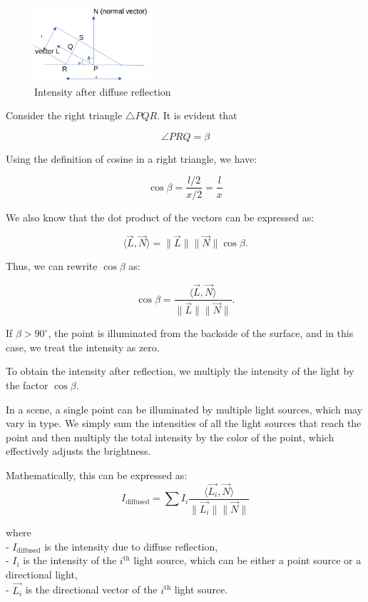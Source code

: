 \documentclass[conference]{IEEEtran}
\begin{document}
\begin{figure}[htbp]
    \centerline{\includegraphics[width=0.38\textwidth]{./figs/intensity.png}}
    \caption{Intensity after diffuse reflection}
\end{figure}

Consider the right triangle $ \triangle PQR $. It is evident that 

$$\angle PRQ = \beta$$

Using the definition of cosine in a right triangle, we have:

$$\cos \beta = \frac{l/2}{x/2} = \frac{l}{x}$$

We also know that the dot product of the vectors can be expressed as:

$$\langle \vec{L}, \vec{N} \rangle = \|\vec{L}\| \|\vec{N}\| \cos \beta.$$

Thus, we can rewrite $ \cos \beta $ as:

$$\cos \beta = \frac{\langle \vec{L}, \vec{N} \rangle}{\|\vec{L}\| \|\vec{N}\|}.$$

If $ \beta > 90^\circ $, the point is illuminated from the backside of the surface, and in this case, we treat the intensity as zero.

To obtain the intensity after reflection, we multiply the intensity of the light by the factor $ \cos \beta $.

In a scene, a single point can be illuminated by multiple light sources, which may vary in type. We simply sum the intensities of all the light sources that reach the point and then multiply the total intensity by the color of the point, which effectively adjusts the brightness.

Mathematically, this can be expressed as:
\begin{equation}
    I_{\text{diffused}} = \sum I_i \frac{\langle \vec{L_i}, \vec{N} \rangle}{\|\vec{L_i}\| \|\vec{N}\|}
    \label{diffuse}
\end{equation}
    

where\\
- $ I_{\text{diffused}} $ is the intensity due to diffuse reflection,\\
- $ I_i $ is the intensity of the $ i^{\text{th}} $ light source, which can be either a point source or a directional light,\\
- $ \vec{L_i} $ is the directional vector of the $ i^{\text{th}} $ light source.
\end{document}
